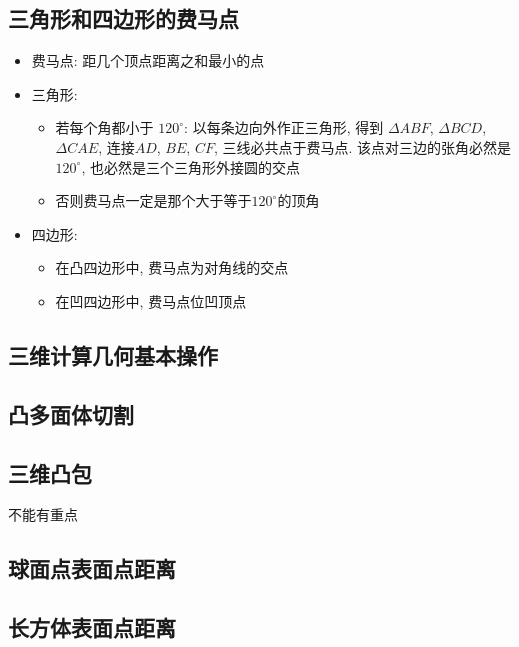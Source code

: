 \documentclass[landscape, twocolumn, 8pt, a4paper, twoside]{extarticle}
\begin{document}
  \subsection{三角形和四边形的费马点}
    \begin{itemize}
    \item 费马点: 距几个顶点距离之和最小的点
    \item 三角形:
      \begin{itemize}
      \item 若每个角都小于 $120^{\circ}$: 以每条边向外作正三角形, 得到 $\Delta ABF$, $\Delta BCD$, $\Delta CAE$, 连接$AD$, $BE$, $CF$, 三线必共点于费马点. 该点对三边的张角必然是$120^{\circ}$, 也必然是三个三角形外接圆的交点
      \item 否则费马点一定是那个大于等于$120^{\circ}$的顶角
      \end{itemize}
    \item 四边形:
      \begin{itemize}
      \item 在凸四边形中, 费马点为对角线的交点
      \item 在凹四边形中, 费马点位凹顶点
      \end{itemize}
    \end{itemize}

  \subsection{三维计算几何基本操作}
    

  \subsection{凸多面体切割}
    

  \subsection{三维凸包}
    不能有重点
    

  \subsection{球面点表面点距离}
    
    
  \subsection{长方体表面点距离}
    
\end{document}
